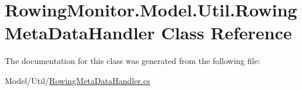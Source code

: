 \hypertarget{class_rowing_monitor_1_1_model_1_1_util_1_1_rowing_meta_data_handler}{}\section{Rowing\+Monitor.\+Model.\+Util.\+Rowing\+Meta\+Data\+Handler Class Reference}
\label{class_rowing_monitor_1_1_model_1_1_util_1_1_rowing_meta_data_handler}


The documentation for this class was generated from the following file\+:\begin{DoxyCompactItemize}
\item 
Model/\+Util/\hyperlink{_rowing_meta_data_handler_8cs}{Rowing\+Meta\+Data\+Handler.\+cs}\end{DoxyCompactItemize}
